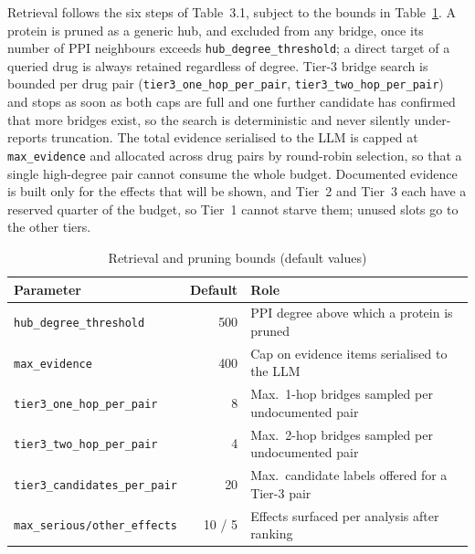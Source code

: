 Retrieval follows the six steps of Table~3.1, subject to the bounds in
Table~\ref{tab:bounds}. A protein is pruned as a generic hub, and excluded
from any bridge, once its number of PPI neighbours exceeds
\texttt{hub\_degree\_threshold}; a direct target of a queried drug is always
retained regardless of degree. Tier-3 bridge search is bounded per drug
pair (\texttt{tier3\_one\_hop\_per\_pair}, \texttt{tier3\_two\_hop\_per\_pair})
and stops as soon as both caps are full and one further candidate has
confirmed that more bridges exist, so the search is deterministic and never
silently under-reports truncation. The total evidence serialised to the LLM
is capped at \texttt{max\_evidence} and allocated across drug pairs by
round-robin selection, so that a single high-degree pair cannot consume the
whole budget. Documented evidence is built only for the effects that will be
shown, and Tier~2 and Tier~3 each have a reserved quarter of the budget, so
Tier~1 cannot starve them; unused slots go to the other tiers.

\begin{table}[t]
  \caption{Retrieval and pruning bounds (default values)}
  \label{tab:bounds}
  \centering
  \begin{tabular}{@{}lrl@{}}
    \toprule
    Parameter & Default & Role \\
    \midrule
    \texttt{hub\_degree\_threshold}      & 500 & PPI degree above which a protein is pruned \\
    \texttt{max\_evidence}               & 400 & Cap on evidence items serialised to the LLM \\
    \texttt{tier3\_one\_hop\_per\_pair}  & 8   & Max.\ 1-hop bridges sampled per undocumented pair \\
    \texttt{tier3\_two\_hop\_per\_pair}  & 4   & Max.\ 2-hop bridges sampled per undocumented pair \\
    \texttt{tier3\_candidates\_per\_pair}& 20  & Max.\ candidate labels offered for a Tier-3 pair \\
    \texttt{max\_serious/other\_effects} & 10 / 5 & Effects surfaced per analysis after ranking \\
    \bottomrule
  \end{tabular}
\end{table}

